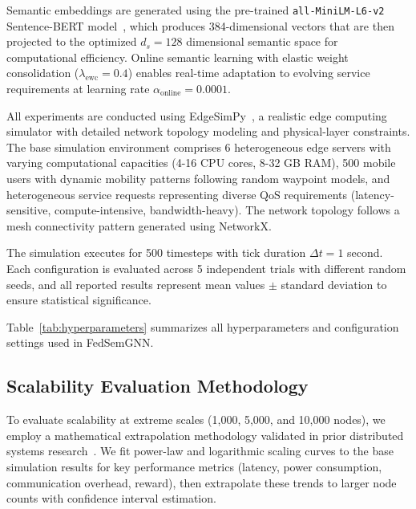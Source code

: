 Semantic embeddings are generated using the pre-trained \texttt{all-MiniLM-L6-v2} Sentence-BERT model~\cite{Reimers2019_SentenceBERT}, which produces 384-dimensional vectors that are then projected to the optimized $d_s = 128$ dimensional semantic space for computational efficiency. Online semantic learning with elastic weight consolidation ($\lambda_{\text{ewc}} = 0.4$) enables real-time adaptation to evolving service requirements at learning rate $\alpha_{\text{online}} = 0.0001$.

All experiments are conducted using EdgeSimPy~\cite{edgesimpy}, a realistic edge computing simulator with detailed network topology modeling and physical-layer constraints. The base simulation environment comprises 6 heterogeneous edge servers with varying computational capacities (4-16 CPU cores, 8-32 GB RAM), 500 mobile users with dynamic mobility patterns following random waypoint models, and heterogeneous service requests representing diverse QoS requirements (latency-sensitive, compute-intensive, bandwidth-heavy). The network topology follows a mesh connectivity pattern generated using NetworkX.

The simulation executes for 500 timesteps with tick duration $\Delta t = 1$ second. Each configuration is evaluated across 5 independent trials with different random seeds, and all reported results represent mean values $\pm$ standard deviation to ensure statistical significance.

Table~\ref{tab:hyperparameters} summarizes all hyperparameters and configuration settings used in FedSemGNN.


\subsection{Scalability Evaluation Methodology}
To evaluate scalability at extreme scales (1,000, 5,000, and 10,000 nodes), we employ a mathematical extrapolation methodology validated in prior distributed systems research~\cite{Bonawitz2019TowardsFL, Li2020_FederatedOptimization}. We fit power-law and logarithmic scaling curves to the base simulation results for key performance metrics (latency, power consumption, communication overhead, reward), then extrapolate these trends to larger node counts with confidence interval estimation.

